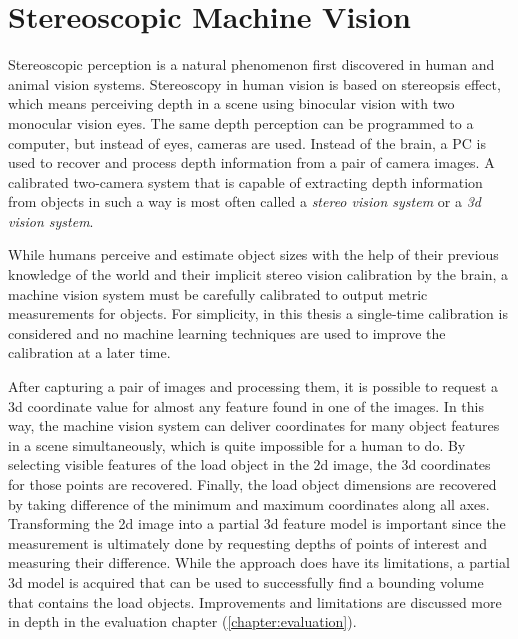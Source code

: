 \documentclass[12pt,a4paper,oneside,pdftex]{report}
\begin{document}
{%
\chapter{Stereoscopic Machine Vision}
\label{chapter:stereographic_machine_vision}
Stereoscopic perception is a natural phenomenon first discovered in human and animal vision systems. Stereoscopy in human vision is based on stereopsis effect, which means perceiving depth in a scene using binocular vision with two monocular vision eyes. The same depth perception can be programmed to a computer, but instead of eyes, cameras are used. Instead of the brain, a PC is used to recover and process depth information from a pair of camera images. A calibrated two-camera system that is capable of extracting depth information from objects in such a way is most often called a \emph{stereo vision system} or a \emph{3d vision system}.

While humans perceive and estimate object sizes with the help of their previous knowledge of the world and their implicit stereo vision calibration by the brain, a machine vision system must be carefully calibrated to output metric measurements for objects. For simplicity, in this thesis a single-time calibration is considered and no machine learning techniques are used to improve the calibration at a later time.

After capturing a pair of images and processing them, it is possible to request a 3d coordinate value for almost any feature found in one of the images. In this way, the machine vision system can deliver coordinates for many object features in a scene simultaneously, which is quite impossible for a human to do. By selecting visible features of the load object in the 2d image, the 3d coordinates for those points are recovered. Finally, the load object dimensions are recovered by taking difference of the minimum and maximum coordinates along all axes. Transforming the 2d image into a partial 3d feature model is important since the measurement is ultimately done by requesting depths of points of interest and measuring their difference. While the approach does have its limitations, a partial 3d model is acquired that can be used to successfully find a bounding volume that contains the load objects. Improvements and limitations are discussed more in depth in the evaluation chapter (\ref{chapter:evaluation}).

}
\end{document}
